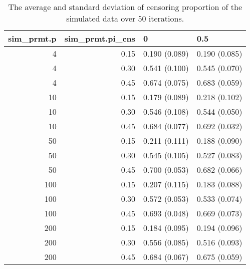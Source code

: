 \begin{table}[ht]
\centering
\begin{tabular}{rrll}
  \hline
sim\_prmt.p & sim\_prmt.pi\_cns & 0 & 0.5 \\ 
  \hline
  4 & 0.15 & 0.190 (0.089) & 0.190 (0.085) \\ 
    4 & 0.30 & 0.541 (0.100) & 0.545 (0.070) \\ 
    4 & 0.45 & 0.674 (0.075) & 0.683 (0.059) \\ 
   10 & 0.15 & 0.179 (0.089) & 0.218 (0.102) \\ 
   10 & 0.30 & 0.546 (0.108) & 0.544 (0.050) \\ 
   10 & 0.45 & 0.684 (0.077) & 0.692 (0.032) \\ 
   50 & 0.15 & 0.211 (0.111) & 0.188 (0.090) \\ 
   50 & 0.30 & 0.545 (0.105) & 0.527 (0.083) \\ 
   50 & 0.45 & 0.700 (0.053) & 0.682 (0.066) \\ 
  100 & 0.15 & 0.207 (0.115) & 0.183 (0.088) \\ 
  100 & 0.30 & 0.572 (0.053) & 0.533 (0.074) \\ 
  100 & 0.45 & 0.693 (0.048) & 0.669 (0.073) \\ 
  200 & 0.15 & 0.184 (0.095) & 0.194 (0.096) \\ 
  200 & 0.30 & 0.556 (0.085) & 0.516 (0.093) \\ 
  200 & 0.45 & 0.684 (0.067) & 0.675 (0.059) \\ 
   \hline
\end{tabular}
\caption{The average and standard deviation of censoring proportion of the simulated data over 50 iterations.} 
\label{tab:sim_cnr_prop}
\end{table}

